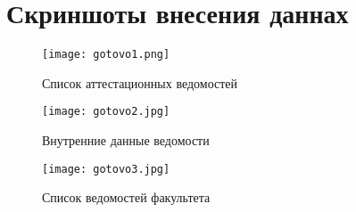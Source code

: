\documentclass[12pt,a4paper]{scrartcl}
\begin{document}
\section{Скриншоты внесения даннах}
\label{sec:picexample}
\begin{figure}[h]
	\centering
	\texttt{[image: gotovo1.png]}
	\caption{Список аттестационных ведомостей}\label{fig:par}
\end{figure}
\begin{figure}[h]
	\centering
	\texttt{[image: gotovo2.jpg]}
	\caption{Внутренние данные ведомости}\label{fig:par}
\end{figure}
\begin{figure}[h]
	\centering
	\texttt{[image: gotovo3.jpg]}
	\caption{Список ведомостей факультета}\label{fig:par}
\end{figure}
\end{document}
